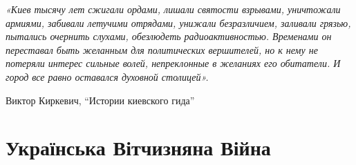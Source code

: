  
 
 
 
 

\begin{center}
\Large\em\color{blue}
«Киев тысячу лет сжигали ордами, лишали святости взрывами, уничтожали армиями,
забивали летучими отрядами, унижали безразличием, заливали грязью, пытались
очернить слухами, обезлюдеть радиоактивностью. Временами он переставал быть
желанным для политических вершителей, но к нему не потеряли интерес сильные
волей, непреклонные в желаниях его обитатели. И город все равно оставался
духовной столицей».

Виктор Киркевич, \enquote{Истории киевского гида}
\end{center}

\clearpage
\chapter{Українська Вітчизняна Війна}















